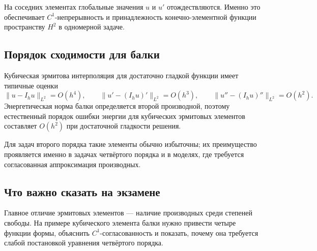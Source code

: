На соседних элементах глобальные значения $u$ и $u'$ отождествляются. Именно это
обеспечивает $C^1$-непрерывность и принадлежность конечно-элементной функции пространству
$H^2$ в одномерной задаче.

\subsection{Порядок сходимости для балки}

Кубическая эрмитова интерполяция для достаточно гладкой функции имеет типичные оценки
\[
    \|u-I_hu\|_{L^2}=O(h^4),\qquad
    \|u'- (I_hu)'\|_{L^2}=O(h^3),\qquad
    \|u''-(I_hu)''\|_{L^2}=O(h^2).
\]
Энергетическая норма балки определяется второй производной, поэтому естественный
порядок ошибки энергии для кубических эрмитовых элементов составляет $O(h^2)$ при
достаточной гладкости решения.

Для задач второго порядка такие элементы обычно избыточны; их преимущество проявляется
именно в задачах четвёртого порядка и в моделях, где требуется согласованная
аппроксимация производных.

\subsection{Что важно сказать на экзамене}

Главное отличие эрмитовых элементов --- наличие производных среди степеней
свободы. На примере кубического элемента балки нужно привести четыре функции
формы, объяснить $C^1$-согласованность и показать, почему она требуется слабой
постановкой уравнения четвёртого порядка.

\newpage